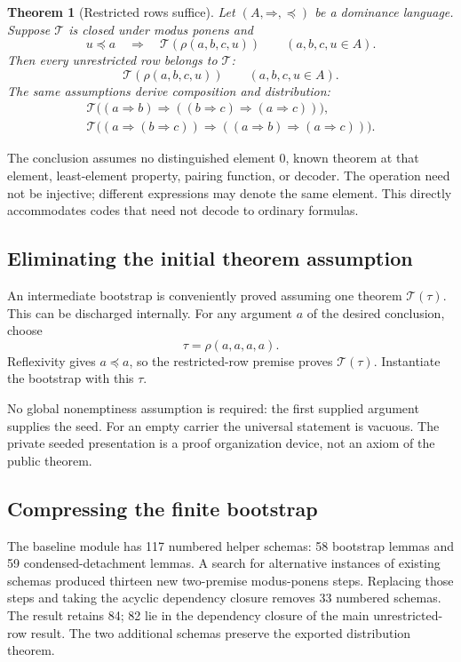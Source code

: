 \documentclass[11pt]{article}
\newtheorem{theorem}{Theorem}[section]
\theoremstyle{definition}\newtheorem{definition}[theorem]{Definition}
\newcommand{\impop}{\mathbin{\Rightarrow}}
\newcommand{\Rho}[4]{\rho(#1,#2,#3,#4)}
\newcommand{\T}{\mathcal T}
\begin{document}
\begin{theorem}[Restricted rows suffice]
\label{thm:rho}
Let $(A,\impop,\preceq)$ be a dominance language. Suppose $\T$ is closed under modus ponens and
\[
 u\preceq a\quad\Longrightarrow\quad\T(\Rho{a}{b}{c}{u})
 \qquad(a,b,c,u\in A).
\]
Then every unrestricted row belongs to $\T$:
\[
 \T(\Rho{a}{b}{c}{u})\qquad(a,b,c,u\in A).
\]
The same assumptions derive composition and distribution:
\begin{align*}
\T\bigl((a\impop b)\impop((b\impop c)\impop(a\impop c))\bigr),\\
\T\bigl((a\impop(b\impop c))\impop((a\impop b)\impop(a\impop c))\bigr).
\end{align*}
\end{theorem}

The conclusion assumes no distinguished element $0$, known theorem at that element, least-element property, pairing function, or decoder. The operation need not be injective; different expressions may denote the same element. This directly accommodates codes that need not decode to ordinary formulas.

\subsection{Eliminating the initial theorem assumption}
An intermediate bootstrap is conveniently proved assuming one theorem $\T(\tau)$. This can be discharged internally. For any argument $a$ of the desired conclusion, choose
\[
 \tau=\Rho{a}{a}{a}{a}.
\]
Reflexivity gives $a\preceq a$, so the restricted-row premise proves $\T(\tau)$. Instantiate the bootstrap with this $\tau$.

No global nonemptiness assumption is required: the first supplied argument supplies the seed. For an empty carrier the universal statement is vacuous. The private seeded presentation is a proof organization device, not an axiom of the public theorem.

\subsection{Compressing the finite bootstrap}
The baseline module has 117 numbered helper schemas: 58 bootstrap lemmas and 59 condensed-detachment lemmas. A search for alternative instances of existing schemas produced thirteen new two-premise modus-ponens steps. Replacing those steps and taking the acyclic dependency closure removes 33 numbered schemas. The result retains 84; 82 lie in the dependency closure of the main unrestricted-row result. The two additional schemas preserve the exported distribution theorem.
\end{document}
